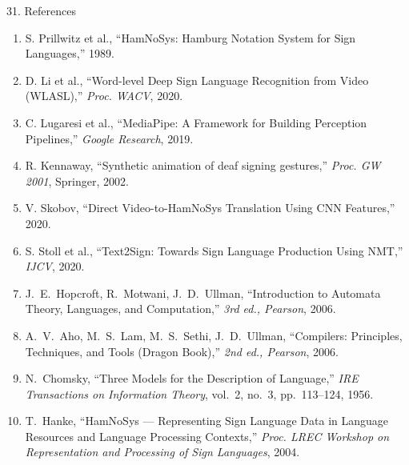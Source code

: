 \documentclass[aspectratio=169]{beamer}
\begin{document}
\begin{frame}{31. References}
\scriptsize
\begin{enumerate}\setlength{\itemsep}{0.06cm}
\item S. Prillwitz et al., ``HamNoSys: Hamburg Notation System for Sign Languages,'' 1989.
\item D. Li et al., ``Word-level Deep Sign Language Recognition from Video (WLASL),'' \textit{Proc. WACV}, 2020.
\item C. Lugaresi et al., ``MediaPipe: A Framework for Building Perception Pipelines,'' \textit{Google Research}, 2019.
\item R. Kennaway, ``Synthetic animation of deaf signing gestures,'' \textit{Proc. GW 2001}, Springer, 2002.
\item V. Skobov, ``Direct Video-to-HamNoSys Translation Using CNN Features,'' 2020.
\item S. Stoll et al., ``Text2Sign: Towards Sign Language Production Using NMT,'' \textit{IJCV}, 2020.
\item J.~E.~Hopcroft, R.~Motwani, J.~D.~Ullman, ``Introduction to Automata Theory, Languages, and Computation,'' \textit{3rd ed., Pearson}, 2006.
\item A.~V.~Aho, M.~S.~Lam, M.~S.~Sethi, J.~D.~Ullman, ``Compilers: Principles, Techniques, and Tools (Dragon Book),'' \textit{2nd ed., Pearson}, 2006.
\item N.~Chomsky, ``Three Models for the Description of Language,'' \textit{IRE Transactions on Information Theory}, vol.~2, no.~3, pp.~113--124, 1956.
\item T.~Hanke, ``HamNoSys --- Representing Sign Language Data in Language Resources and Language Processing Contexts,'' \textit{Proc. LREC Workshop on Representation and Processing of Sign Languages}, 2004.
\end{enumerate}
\end{frame}
\end{document}

